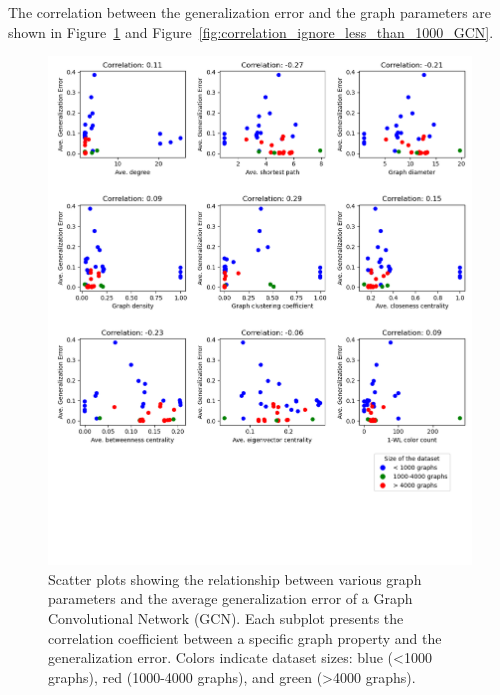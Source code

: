 The correlation between the generalization error and the graph parameters are shown in Figure~\ref{fig:correlation_GCN} and Figure~\ref{fig:correlation_ignore_less_than_1000_GCN}.

\begin{figure}[H]
    \centering
    \includegraphics[scale=0.6]{images/correlation_GCN.png}
    \caption{Scatter plots showing the relationship between various graph parameters and the average generalization error of a Graph Convolutional Network (GCN). Each subplot presents the correlation coefficient between a specific graph property and the generalization error. Colors indicate dataset sizes: blue (<1000 graphs), red (1000-4000 graphs), and green (>4000 graphs).}
    \label{fig:correlation_GCN}
\end{figure}

